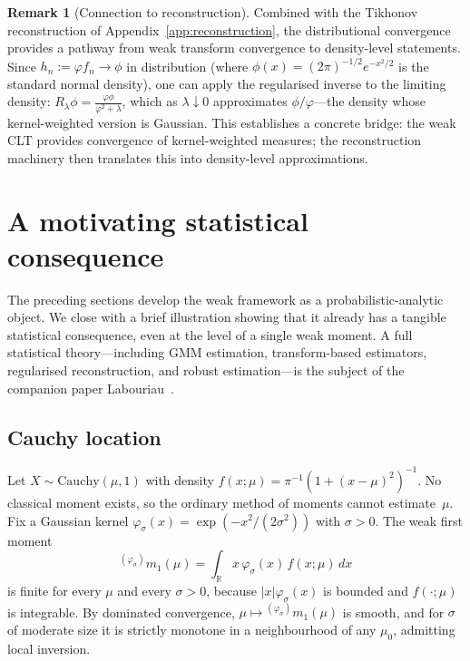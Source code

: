 \documentclass[12pt]{article}
\theoremstyle{definition}
\newtheorem{remark}[theorem]{Remark}
\newcommand{\R}{\mathbb{R}}
\begin{document}
\begin{remark}[Connection to reconstruction]
\label{rem:clt-reconstruction}
Combined with the Tikhonov reconstruction of
Appendix~\ref{app:reconstruction}, the distributional convergence provides
a pathway from weak transform convergence to density-level statements.
Since $h_n := \varphi f_n \to \phi$ in distribution (where
$\phi(x) = (2\pi)^{-1/2}e^{-x^2/2}$ is the standard normal density),
one can apply the regularised inverse to the limiting density:
$R_\lambda\phi = \frac{\varphi\phi}{\varphi^2 + \lambda}$,
which as $\lambda\downarrow 0$ approximates $\phi/\varphi$---the density
whose kernel-weighted version is Gaussian.  This establishes a concrete
bridge: the weak CLT provides convergence of kernel-weighted measures;
the reconstruction machinery then translates this into density-level
approximations.
\end{remark}


\section{A motivating statistical consequence}
\label{sec:motivating-consequence}

The preceding sections develop the weak framework as a probabilistic-analytic object.  We close with a brief illustration showing that it already has a tangible statistical consequence, even at the level of a single weak moment.  A full statistical theory---including GMM estimation, transform-based estimators, regularised reconstruction, and robust estimation---is the subject of the companion paper Labouriau~\cite{LabouriauA2}.

\subsection{Cauchy location}

Let $X \sim \mathrm{Cauchy}(\mu,1)$ with density $f(x;\mu) = \pi^{-1}(1+(x-\mu)^2)^{-1}$.  No classical moment exists, so the ordinary method of moments cannot estimate~$\mu$.  Fix a Gaussian kernel $\varphi_\sigma(x) = \exp(-x^2/(2\sigma^2))$ with $\sigma>0$.  The weak first moment
\[
{}^{(\varphi_\sigma)}m_1(\mu)
=
\int_{\R} x\,\varphi_\sigma(x)\,f(x;\mu)\,dx
\]
is finite for every $\mu$ and every $\sigma>0$, because $|x|\varphi_\sigma(x)$ is bounded and $f(\cdot;\mu)$ is integrable.  By dominated convergence, $\mu\mapsto {}^{(\varphi_\sigma)}m_1(\mu)$ is smooth, and for $\sigma$ of moderate size it is strictly monotone in a neighbourhood of any $\mu_0$, admitting local inversion.
\end{document}
